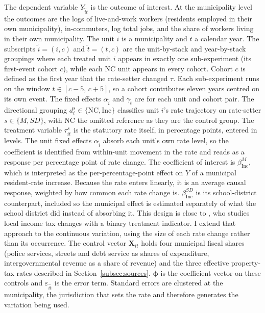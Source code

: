 \documentclass[12pt]{article}
\begin{document}
The dependent variable $Y_{\tilde i \tilde t}$ is the outcome of
interest. At the municipality level the
outcomes are the logs of live-and-work workers (residents employed
in their own municipality), in-commuters, log total jobs, and the
share of workers living in their own municipality. The unit $i$ is a municipality and $t$ a calendar year. The subscripts $\tilde i = (i, c)$ and
$\tilde t = (t, c)$ are the unit-by-stack and year-by-stack
groupings where each treated unit $i$ appears in exactly one
sub-experiment (its first-event cohort $c$), while each NC unit
appears in every cohort. Cohort $c$ is defined as the first year that the rate-setter changed $\tau$. Each sub-experiment runs on the window
$t \in [c-5,\, c+5]$, so a cohort contributes eleven years centred on its
own event. The fixed effects
$\alpha_{\tilde i}$ and $\gamma_{\tilde t}$ are for each unit and cohort pair. The directional grouping
$d^{s}_{i} \in \{\text{NC}, \text{Inc}\}$ classifies
unit $i$'s rate trajectory on rate-setter $s \in \{M, SD\}$, with
NC the omitted reference as they are the control group. The
treatment variable $\tau^{s}_{it}$ is the statutory rate itself,
in percentage points, entered in levels. The unit fixed effects
$\alpha_{\tilde i}$ absorb each unit's own rate level, so the
coefficient is identified from within-unit movement in the rate and
reads as a response per percentage point of rate change. The coefficient of interest is $\beta^{M}_{\text{Inc}}$, which is interpreted as the 
per-percentage-point effect on $Y$ of a municipal resident-rate increase.
Because the rate enters linearly, it is an average causal response,
weighted by how common each rate change is. $\beta^{SD}_{\text{Inc}}$ is its school-district
counterpart, included so the municipal effect is estimated separately of what
the school district did instead of absorbing it.
This design is close to \citet{yushkovLocalIncomeTaxes2025}, who studies
local income tax changes with a binary treatment indicator. I extend that
approach to the continuous variation, using the size of each rate change
rather than its occurrence. The control vector
$\mathbf{X}_{it}$ holds four municipal fiscal shares (police services,
streets and debt service as shares of expenditure, intergovernmental
revenue as a share of revenue) and the three effective property-tax
rates described in Section~\ref{subsec:sources}.
$\boldsymbol{\phi}$ is the
coefficient vector on these controls and $\varepsilon_{\tilde i \tilde t}$
is the error term. Standard errors are clustered at the municipality,
the jurisdiction that sets the rate and therefore generates the
variation being used.
\end{document}
